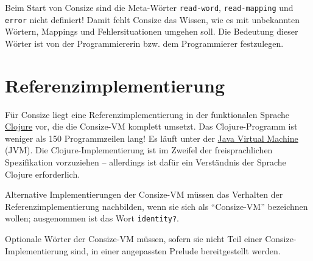 \attention Beim Start von Consize sind die Meta-Wörter \verb|read-word|, \verb|read-mapping| und \verb|error| nicht definiert! Damit fehlt Consize das Wissen, wie es mit unbekannten Wörtern, Mappings und Fehlersituationen umgehen soll. Die Bedeutung dieser Wörter ist von der Programmiererin bzw. dem Programmierer festzulegen.

\section{Referenzimplementierung}
\label{Sec:Referenzimplementierung}

Für Consize liegt eine Referenzimplementierung in der funktionalen Sprache \href{http://clojure.org/}{Clojure} vor, die die Consize-VM komplett umsetzt. Das Clojure-Programm ist weniger als 150 Programmzeilen lang! Es läuft unter der \href{http://de.wikipedia.org/wiki/Java\_Virtual\_Machine}{Java Virtual Machine} (JVM). Die Clojure-Implementierung ist im Zweifel der freisprachlichen Spezifikation vorzuziehen -- allerdings ist dafür ein Verständnis der Sprache Clojure erforderlich.

Alternative Implementierungen der Consize-VM müssen das Verhalten der Referenzimplementierung nachbilden, wenn sie sich als "`Consize-VM"' bezeichnen wollen; ausgenommen ist das Wort \verb|identity?|.

Optionale Wörter der Consize-VM müssen, sofern sie nicht Teil einer Consize-Implementierung sind, in einer angepassten Prelude bereitgestellt werden.

